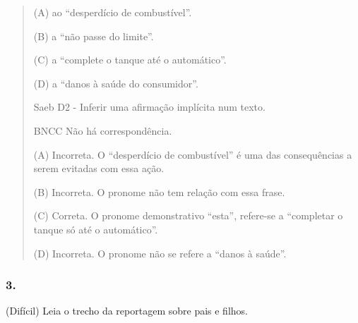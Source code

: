 \begin{quote}
(A) ao ``desperdício de combustível''.

(B) a ``não passe do limite''.

(C) a ``complete o tanque até o automático''.

(D) a ``danos à saúde do consumidor''.

Saeb D2 - Inferir uma afirmação implícita num texto.

BNCC Não há correspondência.

(A) Incorreta. O ``desperdício de combustível'' é uma das consequências
a serem evitadas com essa ação.

(B) Incorreta. O pronome não tem relação com essa frase.

(C) Correta. O pronome demonstrativo ``esta'', refere-se a ``completar o
tanque só até o automático''.

(D) Incorreta. O pronome não se refere a ``danos à saúde''.
\end{quote}

\subsubsection{3. }\label{section-79}

(Difícil) Leia o trecho da reportagem sobre pais e filhos.

